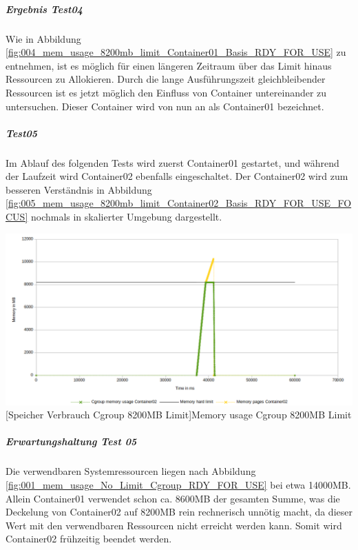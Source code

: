 \subparagraph{Ergebnis Test04}
Wie in Abbildung \ref{fig:004_mem_usage_8200mb_limit_Container01_Basis_RDY_FOR_USE} zu entnehmen, ist es möglich für einen längeren Zeitraum über das Limit hinaus Ressourcen zu Allokieren. Durch die lange Ausführungszeit gleichbleibender Ressourcen ist es jetzt möglich den Einfluss von Container untereinander zu untersuchen. Dieser Container wird von nun an als Container01 bezeichnet.

\subparagraph{Test05}
Im Ablauf des folgenden Tests wird zuerst Container01 gestartet, und während der Laufzeit wird Container02 ebenfalls eingeschaltet. Der Container02 wird zum besseren Verständnis in Abbildung \ref{fig:005_mem_usage_8200mb_limit_Container02_Basis_RDY_FOR_USE_FOCUS} nochmals in skalierter Umgebung dargestellt. 


\vspace{1em}
\begin{minipage}{\linewidth}
	\centering
	\includegraphics[width=1\linewidth]{pics/005_mem_usage_8200mb_limit_Container02_Basis_RDY_FOR_USE_FOCUS.png}
	[Speicher Verbrauch Cgroup 8200MB Limit]{Memory usage Cgroup 8200MB Limit}
	\label{fig:005_mem_usage_8200mb_limit_Container02_Basis_RDY_FOR_USE_FOCUS}
\end{minipage}

\subparagraph{Erwartungshaltung Test 05}
Die verwendbaren Systemressourcen liegen nach Abbildung \ref{fig:001_mem_usage_No_Limit_Cgroup_RDY_FOR_USE} bei etwa 14000MB. Allein Container01 verwendet schon ca. 8600MB der gesamten Summe, was die Deckelung von Container02 auf 8200MB rein rechnerisch unnötig macht, da dieser Wert mit den verwendbaren Ressourcen nicht erreicht werden kann. Somit wird Container02 frühzeitig beendet werden. 


